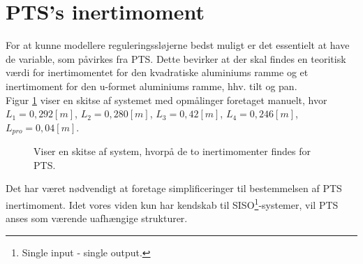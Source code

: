\section{PTS's inertimoment}
\label{sec:teo_PTS}

For at kunne modellere reguleringssløjerne bedst muligt er det essentielt at have de variable, 
som påvirkes fra PTS. Dette bevirker at der skal findes en teoritisk værdi for inertimomentet for den 
kvadratiske aluminiums ramme og et inertimoment for den u-formet aluminiums ramme, hhv. tilt og pan.\\
Figur \ref{fig:inerti_PTS} viser en skitse af systemet med opmålinger foretaget manuelt, hvor ${L_{1}} =0,292 [m]$,
${L_{2}} =0,280 [m]$, ${L_{3}}= 0,42 [m]$, ${L_{4}} =0,246 [m]$, ${L_{pro}}=0,04 [m]$.
\begin{figure}[!th]
\centering
\begin{tikzpicture}[scale=0.8]

\end{tikzpicture}
\caption[Skitse af PTS]{Viser en skitse af system, hvorpå de to inertimomenter findes for PTS.}
\label{fig:inerti_PTS}
\end{figure}

Det har været nødvendigt at foretage simplificeringer til bestemmelsen af PTS inertimoment. 
Idet vores viden kun har kendskab til SISO\footnote{Single input - single output.}-systemer, vil PTS anses som værende uafhængige strukturer. 
